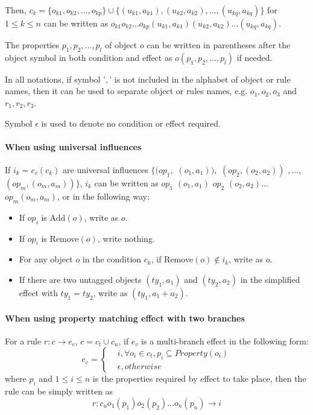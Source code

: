 \documentclass[9pt,a4paper,twoside]{article}
\begin{document}
            Then, $c_k = \{o_{k1},o_{k2},...,o_{kp}\} \cup \{(u_{k1},a_{k1}), (u_{k2},a_{k2}),..., (u_{kq},a_{kq})\}$ for $1 \leq k \leq n$ can be written as 
            $o_{k1}o_{k2}...o_{kp}(u_{k1}, a_{k1})(u_{k2}, a_{k2})...(u_{kq}, a_{kq})$.
            
            The properties $p_1,p_2,...,p_l$ of object $o$ can be written in parentheses after the object symbol in both condition and effect as $o(p_1,p_2,...,p_l)$ if needed.

            In all notations, if symbol '$,$' is not included in the alphabet of object or rule names, then it can be used to separate object or rules names, e.g. $o_1,o_2,o_3$ and $r_1,r_2,r_3$. 
            
            Symbol $\epsilon$ is used to denote no condition or effect required. 

            \paragraph{When using universal influences}
            If $i_k = e_c(c_k)$ are universal influences $\{ (op_1,$ $ (o_1,a_1)),$ $ (op_2, (o_2,a_2))$ $,...,$ $(op_m, (o_m,a_m))  \}$, 
            $i_k$ can be written as $op_1$ $(o_1, a_1)$ $op_2$ $(o_2, a_2)...$ $op_m(o_m, a_m)$, or in the following way:
            \begin{itemize}
                \item If $op_i$ is Add$(o)$, write as $o$.
                \item If $op_i$ is Remove$(o)$, write nothing.
                \item For any object $o$ in the condition $c_k$, if Remove$(o) \notin i_k$, write as $o$.
                \item If there are two untagged objects $(ty_1, a_1)$ and $(ty_2, a_2)$ in the simplified effect with $ty_1 = ty_2$, write as $(ty_1, a_1 + a_2)$.
            \end{itemize}

            \paragraph{When using property matching effect with two branches}
             For a rule $r: c \rightarrow e_c$, $c=c_t \cup c_u$, if $e_c$ is a multi-branch effect in the following form:
            \begin{equation}
                e_c=\left\{
                    \begin{aligned}
                        & i, \forall o_i \in c_t, p_i \subseteq Property(o_i)\\
                        & \epsilon, otherwise
                    \end{aligned}
                \right.
            \end{equation}
            where $p_i$ and $1 \leq i \leq n$ is the properties required by effect to take place, then the rule can be simply written as
            \begin{equation}
                 r: c_uo_1(p_1)o_2(p_2)...o_n(p_n) \rightarrow i
            \end{equation}
\end{document}
